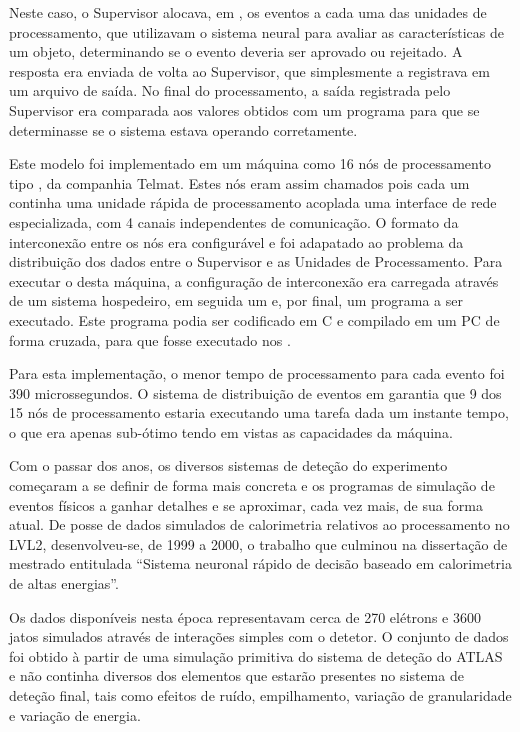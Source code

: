 Neste caso, o Supervisor alocava, em , os eventos a cada uma
das unidades de processamento, que utilizavam o sistema neural para avaliar as
características de um objeto, determinando se o evento deveria ser aprovado ou
rejeitado. A resposta era enviada de volta ao Supervisor, que simplesmente a
registrava em um arquivo de saída. No final do processamento, a saída
registrada pelo Supervisor era comparada aos valores obtidos com um programa
 para que se determinasse se o sistema estava operando
corretamente.

Este modelo foi implementado em um máquina como 16 nós de processamento tipo
, da companhia Telmat. Estes nós eram assim
chamados pois cada um continha uma unidade rápida de processamento acoplada
uma interface de rede especializada, com 4 canais independentes de
comunicação. O formato da interconexão entre os nós era configurável e foi
adapatado ao problema da distribuição dos dados entre o Supervisor e as
Unidades de Processamento. Para executar o  desta máquina, a
configuração de interconexão era carregada através de um sistema hospedeiro,
em seguida um  e, por final, um programa a ser
executado. Este programa podia ser codificado em C e compilado em um PC de
forma cruzada, para que fosse executado nos .

Para esta implementação, o menor tempo de processamento para cada evento foi
390 microssegundos. O sistema de distribuição de eventos em
 garantia que 9 dos 15 nós de processamento estaria
executando uma tarefa dada um instante tempo, o que era apenas sub-ótimo tendo
em vistas as capacidades da máquina.

Com o passar dos anos, os diversos sistemas de deteção do experimento
começaram a se definir de forma mais concreta e os programas de simulação de
eventos físicos a ganhar detalhes e se aproximar, cada vez mais, de sua forma
atual. De posse de dados simulados de calorimetria relativos ao processamento
no LVL2, desenvolveu-se, de 1999 a 2000, o trabalho que culminou na
dissertação de mestrado entitulada ``Sistema neuronal rápido de decisão
baseado em calorimetria de altas energias''.

Os dados disponíveis nesta época representavam cerca de 270 elétrons e 3600
jatos simulados através de interações simples com o detetor. O conjunto de
dados foi obtido à partir de uma simulação primitiva do sistema de deteção do
ATLAS e não continha diversos dos elementos que estarão presentes no sistema
de deteção final, tais como efeitos de ruído, empilhamento, variação de
granularidade e variação de energia.

